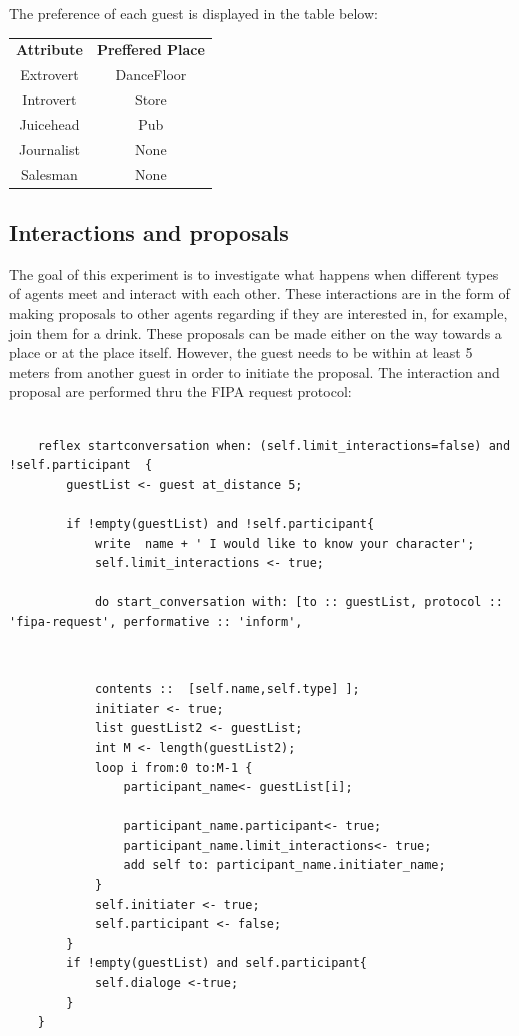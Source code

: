\documentclass[a4paper,10pt]{article}
\begin{document}
The preference of each guest is displayed in the table below:

\begin{center}
\begin{tabular}{ |c|c| } 
 \hline
 \textbf{Attribute} & \textbf{Preffered Place} \\

 Extrovert & DanceFloor \\ 
 Introvert & Store  \\ 
 Juicehead & Pub  \\
 Journalist & None \\
 Salesman & None \\
 
 \hline
\end{tabular}
\end{center}

\subsection{Interactions and proposals}

The goal of this experiment is to investigate what happens when different types of agents meet and interact with each other. These interactions are in the form of making proposals to other agents regarding if they are interested in, for example, join them for a drink. These proposals can be made either on the way towards a place or at the place itself. However, the guest needs to be within at least 5 meters from another guest in order to initiate the proposal. The interaction and proposal are performed thru the FIPA request protocol:

\clearpage
\begin{verbatim}

    reflex startconversation when: (self.limit_interactions=false) and !self.participant  {
		guestList <- guest at_distance 5;
		
		if !empty(guestList) and !self.participant{
			write  name + ' I would like to know your character';
			self.limit_interactions <- true;
		
			do start_conversation with: [to :: guestList, protocol :: 'fipa-request', performative :: 'inform',
\end{verbatim}
\\
\begin{verbatim}
			contents ::  [self.name,self.type] ];
			initiater <- true;
			list guestList2 <- guestList;
			int M <- length(guestList2);
			loop i from:0 to:M-1 {
				participant_name<- guestList[i];

				participant_name.participant<- true;
				participant_name.limit_interactions<- true;
				add self to: participant_name.initiater_name;
			}
			self.initiater <- true;
			self.participant <- false;
		}
		if !empty(guestList) and self.participant{
			self.dialoge <-true;
		}
	}
\end{verbatim}
\end{document}
